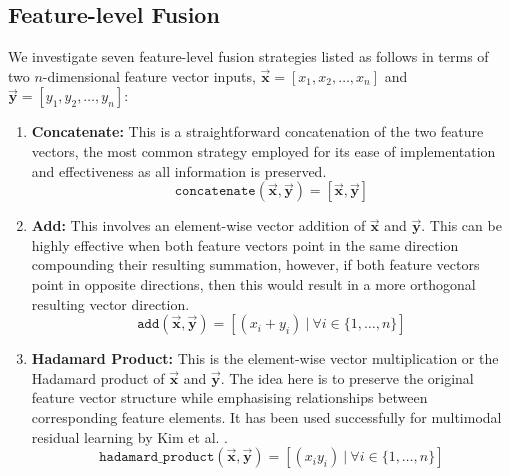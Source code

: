 \documentclass{mpaper}
\begin{document}
\subsection{Feature-level Fusion}
We investigate seven feature-level fusion strategies listed as follows in terms of two $n$-dimensional feature vector inputs, $\bm{\vec{x}} = [x_1, x_2, \ldots, x_n]$ and $\bm{\vec{y}} = [y_1, y_2, \ldots, y_n]$:
\vspace{-0.1cm}
\begin{enumerate}
    \itemsep0em
    \item \textbf{Concatenate:} This is a straightforward concatenation of the two feature vectors, the most common strategy employed for its ease of implementation and effectiveness as all information is preserved.
    $$\mathtt{concatenate}(\bm{\vec{x}}, \bm{\vec{y}}) = [\bm{\vec{x}}, \bm{\vec{y}}]$$

    \item \textbf{Add:} This involves an element-wise vector addition of $\bm{\vec{x}}$ and $\bm{\vec{y}}$. This can be highly effective when both feature vectors point in the same direction compounding their resulting summation, however, if both feature vectors point in opposite directions, then this would result in a more orthogonal resulting vector direction.
    $$\mathtt{add}(\bm{\vec{x}}, \bm{\vec{y}}) = \left[(x_i + y_i) \ | \ \forall i \in \{1, \ldots, n\}\right]$$
    
    \item \textbf{Hadamard Product:} This is the element-wise vector multiplication or the Hadamard product of $\bm{\vec{x}}$ and $\bm{\vec{y}}$. The idea here is to preserve the original feature vector structure while emphasising relationships between corresponding feature elements. It has been used successfully for multimodal residual learning by Kim et al. \cite{kim2016multimodal}.
    $$\mathtt{hadamard\_product}(\bm{\vec{x}}, \bm{\vec{y}}) = \left[(x_iy_i) \ | \ \forall i \in \{1, \ldots, n\}\right]$$
    

\end{enumerate}
\end{document}

